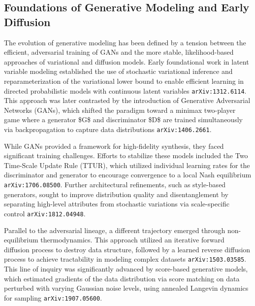 \documentclass[11pt]{article}
\begin{document}
\subsection{Foundations of Generative Modeling and Early Diffusion}

The evolution of generative modeling has been defined by a tension between the efficient, adversarial training of GANs and the more stable, likelihood-based approaches of variational and diffusion models. Early foundational work in latent variable modeling established the use of stochastic variational inference and reparameterization of the variational lower bound to enable efficient learning in directed probabilistic models with continuous latent variables \texttt{arXiv:1312.6114}. This approach was later contrasted by the introduction of Generative Adversarial Networks (GANs), which shifted the paradigm toward a minimax two-player game where a generator \$G\$ and discriminator \$D\$ are trained simultaneously via backpropagation to capture data distributions \texttt{arXiv:1406.2661}.

While GANs provided a framework for high-fidelity synthesis, they faced significant training challenges. Efforts to stabilize these models included the Two Time-Scale Update Rule (TTUR), which utilized individual learning rates for the discriminator and generator to encourage convergence to a local Nash equilibrium \texttt{arXiv:1706.08500}. Further architectural refinements, such as style-based generators, sought to improve distribution quality and disentanglement by separating high-level attributes from stochastic variations via scale-specific control \texttt{arXiv:1812.04948}.

Parallel to the adversarial lineage, a different trajectory emerged through non-equilibrium thermodynamics. This approach utilized an iterative forward diffusion process to destroy data structure, followed by a learned reverse diffusion process to achieve tractability in modeling complex datasets \texttt{arXiv:1503.03585}. This line of inquiry was significantly advanced by score-based generative models, which estimated gradients of the data distribution via score matching on data perturbed with varying Gaussian noise levels, using annealed Langevin dynamics for sampling \texttt{arXiv:1907.05600}.
\end{document}
